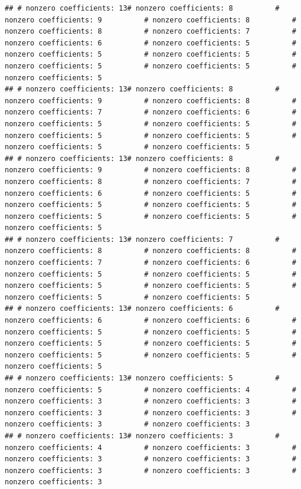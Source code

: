 \documentclass[
]{article}
\begin{document}
\begin{verbatim}
## # nonzero coefficients: 13# nonzero coefficients: 8          # nonzero coefficients: 9          # nonzero coefficients: 8          # nonzero coefficients: 8          # nonzero coefficients: 7          # nonzero coefficients: 6          # nonzero coefficients: 5          # nonzero coefficients: 5          # nonzero coefficients: 5          # nonzero coefficients: 5          # nonzero coefficients: 5          # nonzero coefficients: 5          
## # nonzero coefficients: 13# nonzero coefficients: 8          # nonzero coefficients: 9          # nonzero coefficients: 8          # nonzero coefficients: 7          # nonzero coefficients: 6          # nonzero coefficients: 5          # nonzero coefficients: 5          # nonzero coefficients: 5          # nonzero coefficients: 5          # nonzero coefficients: 5          # nonzero coefficients: 5          
## # nonzero coefficients: 13# nonzero coefficients: 8          # nonzero coefficients: 9          # nonzero coefficients: 8          # nonzero coefficients: 8          # nonzero coefficients: 7          # nonzero coefficients: 6          # nonzero coefficients: 5          # nonzero coefficients: 5          # nonzero coefficients: 5          # nonzero coefficients: 5          # nonzero coefficients: 5          # nonzero coefficients: 5          
## # nonzero coefficients: 13# nonzero coefficients: 7          # nonzero coefficients: 8          # nonzero coefficients: 8          # nonzero coefficients: 7          # nonzero coefficients: 6          # nonzero coefficients: 5          # nonzero coefficients: 5          # nonzero coefficients: 5          # nonzero coefficients: 5          # nonzero coefficients: 5          # nonzero coefficients: 5          
## # nonzero coefficients: 13# nonzero coefficients: 6          # nonzero coefficients: 6          # nonzero coefficients: 6          # nonzero coefficients: 5          # nonzero coefficients: 5          # nonzero coefficients: 5          # nonzero coefficients: 5          # nonzero coefficients: 5          # nonzero coefficients: 5          # nonzero coefficients: 5          
## # nonzero coefficients: 13# nonzero coefficients: 5          # nonzero coefficients: 5          # nonzero coefficients: 4          # nonzero coefficients: 3          # nonzero coefficients: 3          # nonzero coefficients: 3          # nonzero coefficients: 3          # nonzero coefficients: 3          # nonzero coefficients: 3          
## # nonzero coefficients: 13# nonzero coefficients: 3          # nonzero coefficients: 4          # nonzero coefficients: 3          # nonzero coefficients: 3          # nonzero coefficients: 3          # nonzero coefficients: 3          # nonzero coefficients: 3          # nonzero coefficients: 3          

\end{verbatim}
\end{document}
